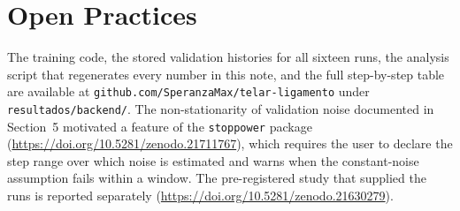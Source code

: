 \documentclass[jou,11pt,donotrepeattitle]{apa7}
\begin{document}
\section*{Open Practices}

The training code, the stored validation histories for all sixteen runs, the analysis script that
regenerates every number in this note, and the full step-by-step table are available at
\texttt{github.com/SperanzaMax/telar-ligamento} under \texttt{resultados/backend/}. The
non-stationarity of validation noise documented in Section~5 motivated a feature of the
\texttt{stoppower} package (\url{https://doi.org/10.5281/zenodo.21711767}), which requires the
user to declare the step range over which noise is estimated and warns when the constant-noise
assumption fails within a window. The pre-registered study that supplied the runs is reported
separately (\url{https://doi.org/10.5281/zenodo.21630279}).
\end{document}

